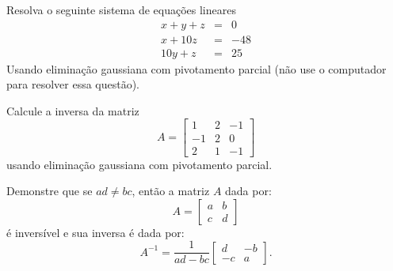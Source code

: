 \begin{exer} Resolva o seguinte sistema de equações lineares
\begin{eqnarray}
x+y+z&=&0\\
x+10z&=&-48\\
10y+z&=&25
\end{eqnarray} Usando eliminação gaussiana com pivotamento parcial (não use o computador para resolver essa questão).
\end{exer}

\begin{exer}Calcule a inversa da matriz
  \begin{equation}
    A = \begin{bmatrix}
      1&2&-1\\
      -1&2&0\\
      2&1&-1
    \end{bmatrix}
  \end{equation}
usando eliminação gaussiana com pivotamento parcial.
\end{exer}

\begin{exer} Demonstre que se $ad\neq bc$, então a matriz $A$ dada por:
  \begin{equation}
    A = \begin{bmatrix}
      a&b\\c&d
    \end{bmatrix}
  \end{equation}
é inversível e sua inversa é dada por:
\begin{equation}
  A^{-1}=\frac{1}{ad-bc}
  \begin{bmatrix}
    d&-b\\-c&a
  \end{bmatrix}.
\end{equation}
\end{exer}

